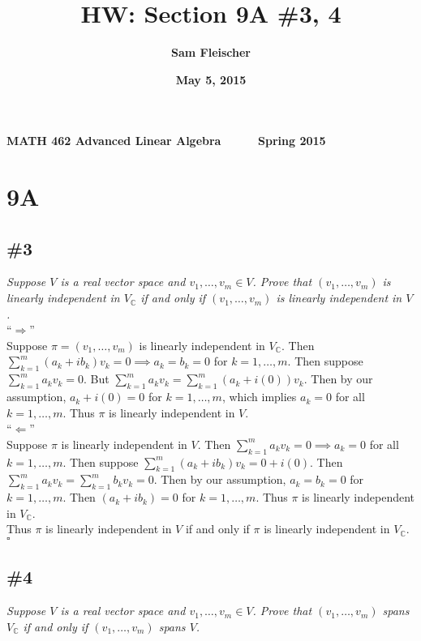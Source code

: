 \documentclass[12pt]{article}
\title{\bf HW: Section 9A \#3, 4}
\author{\bf Sam Fleischer}
\date{\bf May 5, 2015}
\begin{document}
{\bf MATH 462 \hfill Advanced Linear Algebra \ \ \ \ \ \hfill Spring 2015} 

{\let\newpage\relax\maketitle}

\section*{9A}
\subsection*{\#3}
{\it Suppose $V$ is a real vector space and $v_1, \dots, v_m \in V$.  Prove that $(v_1, \dots, v_m)$ is linearly independent in $V_{\mathbb{C}}$ if and only if $(v_1, \dots, v_m)$ is linearly independent in $V$.} \\

\noindent ``$\Longrightarrow$'' \\
Suppose $\pi = (v_1, \dots, v_m)$ is linearly independent in $V_{\mathbb{C}}$.  Then $\sum_{k = 1}^{m}(a_k + ib_k)v_k = 0 \implies a_k = b_k = 0$ for $k = 1, \dots, m$.  Then suppose $\sum_{k = 1}^ma_kv_k = 0$.  But $\sum_{k = 1}^ma_kv_k = \sum_{k = 1}^m(a_k + i(0))v_k$.  Then by our assumption, $a_k + i(0) = 0$ for $k = 1, \dots, m$, which implies $a_k = 0$ for all $k = 1, \dots, m$.  Thus $\pi$ is linearly independent in $V$. \\

\noindent ``$\Longleftarrow$'' \\
Suppose $\pi$ is linearly independent in $V$.  Then $\sum_{k = 1}^ma_kv_k = 0 \implies a_k = 0$ for all $k = 1, \dots, m$.  Then suppose $\sum_{k = 1}^m(a_k + ib_k)v_k = 0 + i(0)$.  Then $\sum_{k = 1}^ma_kv_k = \sum_{k = 1}^mb_kv_k = 0$.  Then by our assumption, $a_k = b_k = 0$ for $k = 1, \dots, m$.  Then $(a_k +ib_k) = 0$ for $k = 1, \dots, m$.  Thus $\pi$ is linearly independent in $V_{\mathbb{C}}$. \\

\noindent Thus $\pi$ is linearly independent in $V$ if and only if $\pi$ is linearly independent in $V_{\mathbb{C}}$. \hfill $\square$

\subsection*{\#4}
{\it Suppose $V$ is a real vector space and $v_1, \dots, v_m \in V$.  Prove that $(v_1, \dots, v_m)$ spans $V_{\mathbb{C}}$ if and only if $(v_1, \dots, v_m)$ spans $V$.} \\
\end{document}
